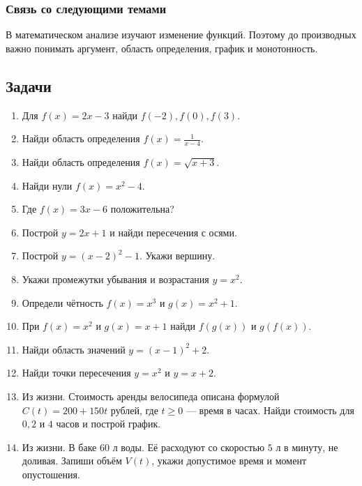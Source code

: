 \documentclass[12pt,a4paper]{article}
\theoremstyle{definition}
\theoremstyle{plain}
\theoremstyle{remark}
\begin{document}
\subsubsection*{Связь со следующими темами}
В математическом анализе изучают изменение функций. Поэтому до производных важно понимать аргумент, область определения, график и монотонность.
\subsection*{Задачи}
\begin{enumerate}[label=\thesection.\arabic*.,leftmargin=2.8em,itemsep=12pt]
\item Для \(f (x) = 2 x - 3\) найди \(f (- 2),\allowbreak f (0),\allowbreak f (3)\).
\item Найди область определения \(f (x) = \frac{1}{x - 4}\).
\item Найди область определения \(f (x) = \sqrt{x + 3}\).
\item Найди нули \(f (x) = x^{2} - 4\).
\item Где \(f (x) = 3 x - 6\) положительна?
\item Построй \(y = 2 x + 1\) и найди пересечения с осями.
\item Построй \(y = (x - 2)^{2} - 1\). Укажи вершину.
\item Укажи промежутки убывания и возрастания \(y = x^{2}\).
\item Определи чётность \(f (x) = x^{3}\) и \(g (x) = x^{2} + 1\).
\item При \(f (x) = x^{2}\) и \(g (x) = x + 1\) найди \(f (g (x))\) и \(g (f (x))\).
\item Найди область значений \(y = (x - 1)^{2} + 2\).
\item Найди точки пересечения \(y = x^{2}\) и \(y = x + 2\).
\item Из жизни. Стоимость аренды велосипеда описана формулой \(C (t) = 200 + 150 t\) рублей, где \(t \ge  0\) — время в часах. Найди стоимость для \(0,\allowbreak 2\) и \(4\) часов и построй график.
\item Из жизни. В баке \(60\) л воды. Её расходуют со скоростью \(5\) л в минуту, не доливая. Запиши объём \(V (t)\), укажи допустимое время и момент опустошения.

\end{enumerate}
\end{document}

